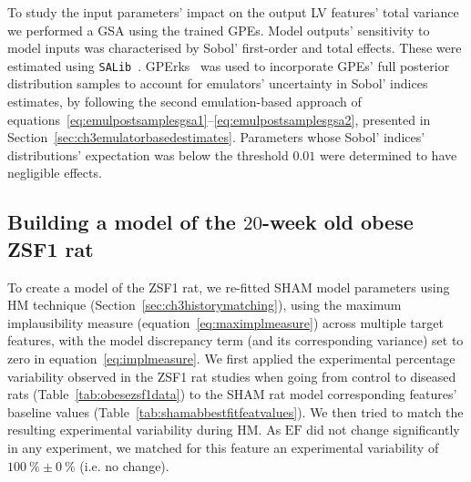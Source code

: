 \vspace{0.2cm}
To study the input parameters' impact on the output LV features' total variance we performed a GSA using the trained GPEs. Model outputs' sensitivity to model inputs was characterised by Sobol' first-order and total effects. These were estimated using \texttt{SALib}~\cite{Herman:2017}. GPErks~\cite{GPErks:2021} was used to incorporate GPEs' full posterior distribution samples to account for emulators' uncertainty in Sobol' indices estimates, by following the second emulation-based approach of equations~\eqref{eq:emulpostsamplesgsa1}--\eqref{eq:emulpostsamplesgsa2}, presented in Section~\ref{sec:ch3emulatorbasedestimates}. Parameters whose Sobol' indices' distributions' expectation was below the threshold $0.01$ were determined to have negligible effects.


%
%
%
\subsection{Building a model of the $20$-week old obese ZSF1 rat}\label{sec:ch7buildingthezsf1ratmodelmethods}
To create a model of the ZSF1 rat, we re-fitted SHAM model parameters using HM technique (Section~\ref{sec:ch3historymatching}), using the maximum implausibility measure (equation~\eqref{eq:maximplmeasure}) across multiple target features, with the model discrepancy term (and its corresponding variance) set to zero in equation~\eqref{eq:implmeasure}. We first applied the experimental percentage variability observed in the ZSF1 rat studies when going from control to diseased rats (Table~\ref{tab:obesezsf1data}) to the SHAM rat model corresponding features' baseline values (Table~\ref{tab:shamabbestfitfeatvalues}). We then tried to match the resulting experimental variability during HM. As $\textrm{EF}$ did not change significantly in any experiment, we matched for this feature an experimental variability of $\SI{100}{\percent}\pm\SI{0}{\percent}$ (i.e. no change).

